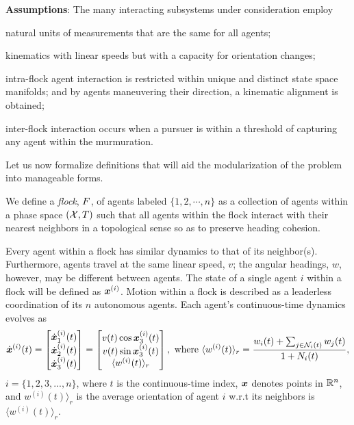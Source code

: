  \textbf{Assumptions}:
The many interacting subsystems under consideration employ
 \begin{inparaenum}[(i)]
 	\item natural units of measurements that are the same for all agents; 
 	\item kinematics with linear speeds but with a capacity for orientation changes;
 	\item intra-flock agent interaction is restricted within unique and distinct state space manifolds; and by agents maneuvering their direction, a kinematic alignment is obtained;
 	\item inter-flock interaction occurs when a pursuer is within a threshold of capturing any agent within the murmuration.
 \end{inparaenum} 
%
Let us now formalize definitions that will aid the modularization of the problem into manageable forms.
%
\begin{definition}
	We define a \textit{flock}, $F$, of agents labeled $\{1, 2, \cdots, n\}$  as a collection of agents within a phase space $(\mathcal{X}, T)$ such that all agents within the flock interact with their nearest neighbors in a topological sense so as to preserve heading cohesion.
	\label{def:flock}
\end{definition}
%
	Every agent within a flock has similar dynamics to that of its neighbor(s). Furthermore, agents travel at the same linear speed, $v$; the angular headings, $w$, however, may be different between agents. The state of a single agent $i$ within a flock will be defined as $\bm{x}^{(i)}$. Motion within a flock is described as a leaderless coordination of its $n$ autonomous agents.  Each agent's continuous-time dynamics evolves as
	\begin{align}
		\dot{\bm{x}}^{(i)}(t) 
		= \begin{bmatrix}
			\dot{\bm{x}}^{(i)}_1(t) \\ \dot{\bm{x}}^{(i)}_2 (t) \\ \dot{\bm{x}}^{(i)}_3 (t)
		\end{bmatrix} = \begin{bmatrix}
			v(t) \cos \bm{x}_3^{(i)}(t) \\ v(t)\sin \bm{x}_3^{(i)}(t) \\ \langle w^{(i)}(t) \rangle_r
		\end{bmatrix}, \text{ where } 	\langle w^{(i)}(t) \rangle_r = \dfrac{w_i(t) + \sum_{j \in \mathcal{N}_i(t)} w_j(t)}{1+N_i(t)},
		\label{eq:DubinsJadbabaie}
	\end{align}
	 $i = \{1, 2, 3, ..., n\}$, where $t$ is the continuous-time index, $\bm{x}$ denotes points in $\mathbb{R}^n$, and $w^{(i)}(t) \rangle_r$ is the average orientation of agent $i$ w.r.t its neighbors is $\langle w^{(i)}(t) \rangle_r$.

